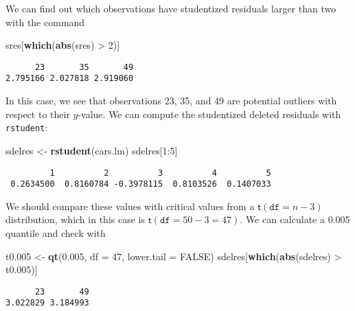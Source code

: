 \documentclass[]{book}
\newenvironment{Shaded}{\begin{snugshade}}{\end{snugshade}}
\newcommand{\KeywordTok}[1]{\textcolor[rgb]{0.13,0.29,0.53}{\textbf{{#1}}}}
\newcommand{\DataTypeTok}[1]{\textcolor[rgb]{0.13,0.29,0.53}{{#1}}}
\newcommand{\DecValTok}[1]{\textcolor[rgb]{0.00,0.00,0.81}{{#1}}}
\newcommand{\FloatTok}[1]{\textcolor[rgb]{0.00,0.00,0.81}{{#1}}}
\newcommand{\StringTok}[1]{\textcolor[rgb]{0.31,0.60,0.02}{{#1}}}
\newcommand{\OtherTok}[1]{\textcolor[rgb]{0.56,0.35,0.01}{{#1}}}
\newcommand{\NormalTok}[1]{{#1}}
\numberwithin{equation}{chapter}
\numberwithin{figure}{chapter}
\theoremstyle{plain}
\theoremstyle{definition}
\theoremstyle{remark}
\theoremstyle{definition}
\theoremstyle{definition}
\theoremstyle{remark}
\begin{document}
We can find out which observations have studentized residuals larger
than two with the command

\begin{Shaded}
\begin{Highlighting}[]
\NormalTok{sres[}\KeywordTok{which}\NormalTok{(}\KeywordTok{abs}\NormalTok{(sres) >}\StringTok{ }\DecValTok{2}\NormalTok{)]}
\end{Highlighting}
\end{Shaded}

\begin{verbatim}
      23       35       49 
2.795166 2.027818 2.919060 
\end{verbatim}

In this case, we see that observations 23, 35, and 49 are potential
outliers with respect to their \(y\)-value. We can compute the
studentized deleted residuals with \texttt{rstudent}:

\begin{Shaded}
\begin{Highlighting}[]
\NormalTok{sdelres <-}\StringTok{ }\KeywordTok{rstudent}\NormalTok{(cars.lm)}
\NormalTok{sdelres[}\DecValTok{1}\NormalTok{:}\DecValTok{5}\NormalTok{]}
\end{Highlighting}
\end{Shaded}

\begin{verbatim}
         1          2          3          4          5 
 0.2634500  0.8160784 -0.3978115  0.8103526  0.1407033 
\end{verbatim}

We should compare these values with critical values from a
\(\mathsf{t}(\mathtt{df}=n-3)\) distribution, which in this case is
\(\mathsf{t}(\mathtt{df}=50-3=47)\). We can calculate a 0.005 quantile
and check with

\begin{Shaded}
\begin{Highlighting}[]
\NormalTok{t0}\FloatTok{.005} \NormalTok{<-}\StringTok{ }\KeywordTok{qt}\NormalTok{(}\FloatTok{0.005}\NormalTok{, }\DataTypeTok{df =} \DecValTok{47}\NormalTok{, }\DataTypeTok{lower.tail =} \OtherTok{FALSE}\NormalTok{)}
\NormalTok{sdelres[}\KeywordTok{which}\NormalTok{(}\KeywordTok{abs}\NormalTok{(sdelres) >}\StringTok{ }\NormalTok{t0}\FloatTok{.005}\NormalTok{)]}
\end{Highlighting}
\end{Shaded}

\begin{verbatim}
      23       49 
3.022829 3.184993 
\end{verbatim}
\end{document}
